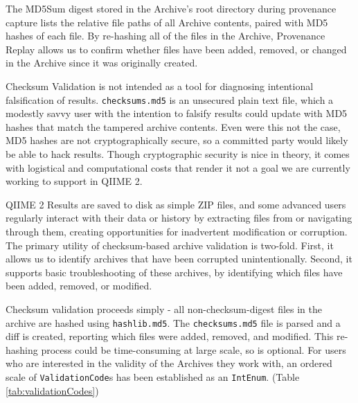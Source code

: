 The MD5Sum digest stored in the Archive’s root directory during provenance
capture lists the relative file paths of all Archive contents, paired with MD5
hashes of each file.  By re-hashing all of the files in the Archive, Provenance
Replay allows us to confirm whether files have been added, removed, or changed
in the Archive since it was originally created. 

Checksum Validation is not intended as a tool for diagnosing intentional
falsification of results. \texttt{checksums.md5} is an unsecured plain text file, which a
modestly savvy user with the intention to falsify results could update with MD5
hashes that match the tampered archive contents. Even were this not the case,
MD5 hashes are not cryptographically secure, so a committed party would likely
be able to hack results. Though cryptographic security is nice in theory, it
comes with logistical and computational costs that render it not a goal we are
currently working to support in QIIME 2.

QIIME 2 Results are saved to disk as simple ZIP files, and some advanced users
regularly interact with their data or history by extracting files from or
navigating through them, creating opportunities for inadvertent modification or
corruption. The primary utility of checksum-based archive validation is
two-fold. First, it allows us to identify archives that have been corrupted
unintentionally. Second, it supports basic troubleshooting of these archives, by
identifying which files have been added, removed, or modified. 

Checksum validation proceeds simply - all non-checksum-digest files in the
archive are hashed using \texttt{hashlib.md5}. The \texttt{checksums.md5} file is parsed and a
diff is created, reporting which files were added, removed, and modified. This
re-hashing process could be time-consuming at large scale, so is optional. For
users who are interested in the validity of the Archives they work with, an
ordered scale of \texttt{ValidationCode}s has been established as an \texttt{IntEnum}. (Table \ref{tab:validationCodes})

